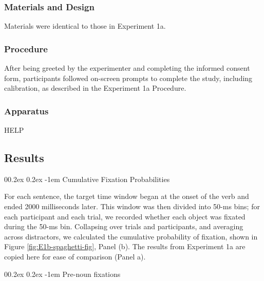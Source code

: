 \documentclass[
  man,floatsintext]{apa6}
\makeatletter
\let\oldparagraph\paragraph
\renewcommand{\paragraph}[1]{\oldparagraph{#1}\mbox{}}
\renewcommand{\paragraph}{\@startsection{paragraph}{4}{\parindent}%
  {0\baselineskip \@plus 0.2ex \@minus 0.2ex}%
  {-1em}%
  {\normalfont\normalsize\bfseries\itshape\typesectitle}}
\makeatother
\begin{document}
\subsubsection{Materials and Design}\label{materials-and-design-1}

Materials were identical to those in Experiment 1a.

\subsubsection{Procedure}\label{procedure-1}

After being greeted by the experimenter and completing the informed consent form, participants followed on-screen prompts to complete the study, including calibration, as described in the Experiment 1a Procedure.

\subsubsection{Apparatus}\label{apparatus}

HELP

\subsection{Results}\label{results-1}

\paragraph{Cumulative Fixation Probabilities}\label{cumulative-fixation-probabilities-1}

For each sentence, the target time window began at the onset of the verb and ended 2000 milliseconds later. This window was then divided into 50-ms bins; for each participant and each trial, we recorded whether each object was fixated during the 50-ms bin. Collapsing over trials and participants, and averaging across distractors, we calculated the cumulative probability of fixation, shown in Figure \ref{fig:E1b-spaghetti-fig}, Panel (b). The results from Experiment 1a are copied here for ease of comparison (Panel a).

\paragraph{Pre-noun fixations}\label{pre-noun-fixations-1}
\end{document}
